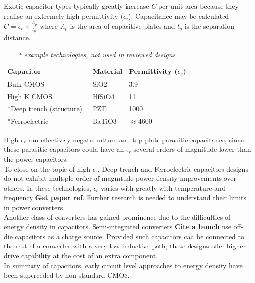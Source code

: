 \documentclass[letterpaper,twocolumn,10pt]{article}
\begin{document}
Exotic capacitor types typically greatly increase $C$ per unit area because they realise an extremely high permittivity ($\epsilon_r$). Capacitance may be calculated $C = \epsilon_r \times \frac{A_p}{l_p}$ where $A_p$ is the area of capacitive plates and $l_p$ is the separation distance. 
\begin{table}
    \begin{tabular}{|l|l|l|}
    \hline
    Capacitor               & Material & Permittivity ($\epsilon_r$) \\ \hline
    Bulk CMOS~\cite{Robertson2004}               & SiO2     & 3.9          \\ \hline
    High K CMOS~\cite{Robertson2004}             & HfSiO4   & 11           \\ \hline
    *Deep trench (structure)~\cite{Johari2009} & PZT      & 1000         \\ \hline
    *Ferroelectric~\cite{Lee2004}			& BaTiO3      & $\approx$4600         \\ \hline    
    \end{tabular}
    \caption{\textit{* example technologies, not used in reviewed designs}}
\end{table}
High $\epsilon_r$ can effectively negate bottom and top plate parasitic capacitance, since these parasitic capacitors could have an $\epsilon_r$ several orders of magnitude lower than the power capacitors.\\ 
To close on the topic of high $\epsilon_r$, Deep trench and Ferroelectric capacitors designs do not exhibit multiple order of magnitude power density improvements over others. In these technologies, $\epsilon_r$ varies with greatly with temperature \cite{Lee2004} and frequency \textbf{Get paper ref}. %
Further research is needed to understand their limits in power converters.\\
Another class of converters has gained prominence due to the difficulties of energy density in capacitors. Semi-integrated converters \textbf{Cite a bunch} use off-die capacitors as a charge source. Provided such capacitors can be connected to the rest of a converter with a very low inductive path, these designs offer higher drive capability at the cost of an extra component.\\
\indent In summary of capacitors, early circuit level approaches to energy density have been superceded by non-standard CMOS. %
\end{document}
